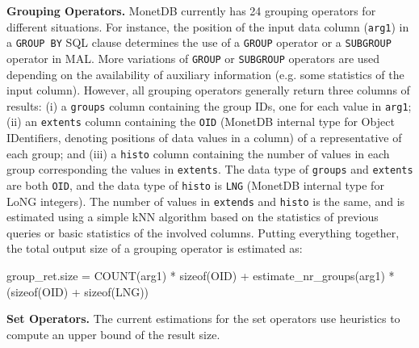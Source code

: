 \documentclass[conference]{IEEEtran}
\def\Skip{\par\medskip\nobreak\noindent}
\begin{document}
\Skip\textbf{Grouping Operators.}
MonetDB currently has 24 grouping operators for different situations.
For instance, the position of the input data column (\texttt{\small arg1}) in a \texttt{\small GROUP BY} SQL clause determines the use of a \texttt{\small GROUP} operator or a \texttt{\small SUBGROUP} operator in MAL.
More variations of \texttt{\small GROUP} or \texttt{\small SUBGROUP} operators are used depending on the availability of auxiliary information (e.g. some statistics of the input column).
However, all grouping operators generally return three columns of results: (i) a \texttt{\small groups} column containing the group IDs, one for each value in \texttt{\small arg1}; (ii) an \texttt{\small extents} column containing the \texttt{\small OID} (MonetDB internal type for Object IDentifiers, denoting positions of data values in a column) of a representative of each group; and (iii) a \texttt{\small histo} column containing the number of values in each group corresponding the values in \texttt{\small extents}.
The data type of \texttt{\small groups} and \texttt{\small extents} are both \texttt{\small OID}, and the data type of \texttt{\small histo} is \texttt{\small LNG} (MonetDB internal type for LoNG integers).
The number of values in \texttt{\small extends} and \texttt{\small histo} is the same, and is estimated using a simple kNN algorithm based on the statistics of previous queries or basic statistics of the involved columns.
Putting everything together, the total output size of a grouping operator is estimated as:
\begin{verb}
group_ret.size = COUNT(arg1) * sizeof(OID) +
  estimate_nr_groups(arg1) * (sizeof(OID) + sizeof(LNG))
\end{verb}

\Skip\textbf{Set Operators.}
%
%
The current estimations for the set operators use heuristics to compute an upper bound of the result size.
\end{document}
